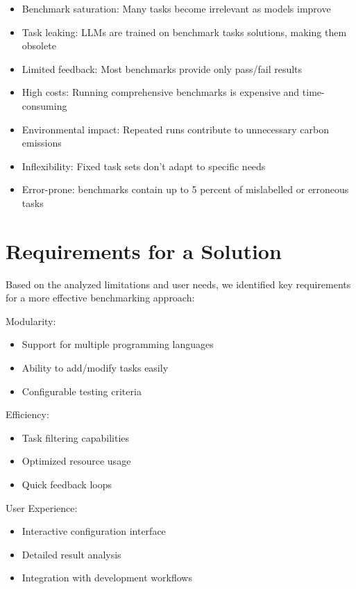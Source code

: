 \begin{itemize}
    \item Benchmark saturation: Many tasks become irrelevant as models improve \cite{vendrow2025largelanguagemodelbenchmarks}
    \item Task leaking: LLMs are trained on benchmark tasks solutions, making them obsolete \cite{vendrow2025largelanguagemodelbenchmarks}
    \item Limited feedback: Most benchmarks provide only pass/fail results
    \item High costs: Running comprehensive benchmarks is expensive and time-consuming
    \item Environmental impact: Repeated runs contribute to unnecessary carbon emissions
    \item Inflexibility: Fixed task sets don't adapt to specific needs
    \item Error-prone: benchmarks contain up to 5 percent of mislabelled or erroneous tasks \cite{vendrow2025largelanguagemodelbenchmarks}
\end{itemize}


\section{Requirements for a Solution}

Based on the analyzed limitations and user needs, we identified key requirements for a more effective benchmarking approach:

Modularity:
\begin{itemize}
    \item Support for multiple programming languages
    \item Ability to add/modify tasks easily
    \item Configurable testing criteria
\end{itemize}

Efficiency:
\begin{itemize}
    \item Task filtering capabilities
    \item Optimized resource usage
    \item Quick feedback loops
\end{itemize}

User Experience:
\begin{itemize}
    \item Interactive configuration interface
    \item Detailed result analysis
    \item Integration with development workflows
\end{itemize}


